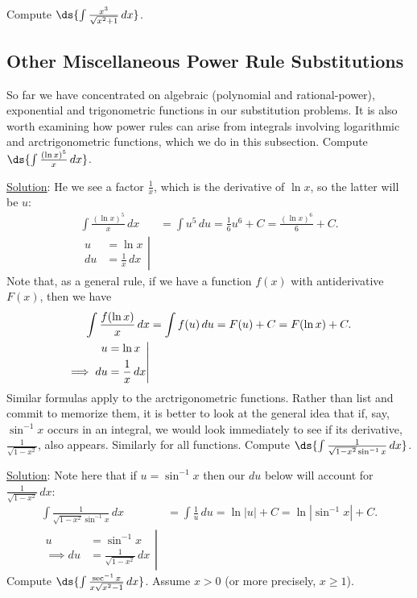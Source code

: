 \bex Compute $\ds{\int\frac{x^3}{\sqrt{x^2+1}}\,dx}$.


\eex




\subsection{Other Miscellaneous Power Rule Substitutions}
So far we have concentrated on algebraic (polynomial and
rational-power), exponential and trigonometric functions in our 
substitution problems.  It is also worth examining how power
rules can arise from integrals involving logarithmic and
arctrigonometric functions, which we do in this subsection.
\bex Compute $\ds{\int\frac{(\ln x)^5}{x}\,dx}$.

\underline{Solution}: He we see a factor $\frac1x$, which is
the derivative of $\ln x$, so the latter will be $u$:
\begin{align*}
\int\frac{(\ln x)^5}{x}\,dx&=\int u^5\,du=\frac16u^6+C
       =\frac{(\ln x)^6}{6}+C.\\
\left.\begin{aligned}
u&=\ln x\\
du&=\frac1x\,dx\end{aligned}\right|&\end{align*}
\eex
Note that, as a general rule, if we have a function
$f(x)$ with antiderivative $F(x)$, then we have\footnotemark
\begin{align}
\int\frac{f(\ln x)}{x}\,dx&=\int f(u)\,du=F(u)+C=F(\ln x)+C.\\
\left.
\begin{aligned}
u&=\ln x\\
\implies du&=\frac1x\,dx\end{aligned}\right|&\notag
\end{align}
Similar formulas apply to the arctrigonometric functions.
Rather than list and commit to memorize them, it is better
to look at the general idea that if, say,
$\sin^{-1}x$ occurs in an integral, we would look immediately
to see if its derivative, $\frac1{\sqrt{1-x^2}}$, also appears.
Similarly for all functions.
\bex Compute $\ds{\int\frac1{\sqrt{1-x^2}\sin^{-1}x}\,dx}$.

\underline{Solution}: Note here that if $u=\sin^{-1}x$ then
our $du$ below will account for
$\frac1{\sqrt{1-x^2}}\,dx$:
\begin{align*}\int\frac1{\sqrt{1-x^2}\sin^{-1}x}\,dx
&=\int\frac1{u}\,du=\ln|u|+C=\ln\left|\sin^{-1}x\right|+C.\\
\left.\begin{aligned}
u&=\sin^{-1}x\\
\implies du&=\frac1{\sqrt{1-x^2}}\,dx
\end{aligned}\right|&\end{align*}
\eex
\bex Compute $\ds{\int\frac{\sec^{-1}x}{x\sqrt{x^2-1}}\,dx}$.  Assume $x>0$
(or more precisely, $x\ge1$).

